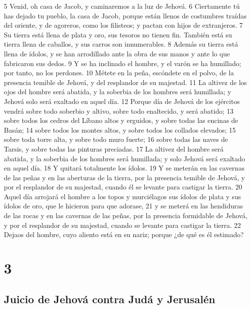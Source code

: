 5 Venid, oh casa de Jacob, y caminaremos a la luz de Jehová.
6 Ciertamente tú has dejado tu pueblo, la casa de Jacob, porque están llenos de costumbres traídas del oriente, y de agoreros, como los filisteos; y pactan con hijos de extranjeros.
7 Su tierra está llena de plata y oro, sus tesoros no tienen fin. También está su tierra llena de caballos, y sus carros son innumerables.
8 Además su tierra está llena de ídolos, y se han arrodillado ante la obra de sus manos y ante lo que fabricaron sus dedos.
9 Y se ha inclinado el hombre, y el varón se ha humillado; por tanto, no los perdones.
10 Métete en la peña, escóndete en el polvo, de la presencia temible de Jehová, y del resplandor de su majestad.
11 La altivez de los ojos del hombre será abatida, y la soberbia de los hombres será humillada; y Jehová solo será exaltado en aquel día.
12 Porque día de Jehová de los ejércitos vendrá sobre todo soberbio y altivo, sobre todo enaltecido, y será abatido;
13 sobre todos los cedros del Líbano altos y erguidos, y sobre todas las encinas de Basán;
14 sobre todos los montes altos, y sobre todos los collados elevados;
15 sobre toda torre alta, y sobre todo muro fuerte;
16 sobre todas las naves de Tarsis, y sobre todas las pinturas preciadas.
17 La altivez del hombre será abatida, y la soberbia de los hombres será humillada; y solo Jehová será exaltado en aquel día.
18 Y quitará totalmente los ídolos.
19 Y se meterán en las cavernas de las peñas y en las aberturas de la tierra, por la presencia temible de Jehová, y por el resplandor de su majestad, cuando él se levante para castigar la tierra.
20 Aquel día arrojará el hombre a los topos y murciélagos sus ídolos de plata y sus ídolos de oro, que le hicieron para que adorase,
21 y se meterá en las hendiduras de las rocas y en las cavernas de las peñas, por la presencia formidable de Jehová, y por el resplandor de su majestad, cuando se levante para castigar la tierra.
22 Dejaos del hombre, cuyo aliento está en su nariz; porque ¿de qué es él estimado?

\chapter{3}

\section*{Juicio de Jehová contra Judá y Jerusalén}

